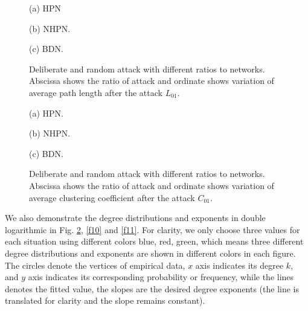 \documentclass[final]{IEEEtran}
\begin{document}
\begin{figure}[t!]
\centering
\begin{minipage}{0.3\linewidth}
\centering
\parbox{15.5cm}{\footnotesize \hspace{2.5cm}(a) HPN}
\end{minipage}
\begin{minipage}{0.3\linewidth}
    \centering
 \parbox{15.5cm}{\footnotesize \hspace{2.3cm}(b) NHPN.}
\end{minipage}
\begin{minipage}{0.3\linewidth}
    \centering
 \parbox{15.5cm}{\footnotesize \hspace{2.5cm}(c) BDN.}
\end{minipage}
\hspace{3ex}
 \caption{\label{f8} Deliberate and random attack with different ratios to networks. Abscissa shows the ratio of attack and ordinate shows variation of average path length after the attack $L_{01}$.}
\end{figure}
\begin{figure}
\centering
\begin{minipage}{0.3\linewidth}
\centering
\parbox{15.5cm}{\footnotesize \hspace{2.5cm}(a) HPN.}
\end{minipage}
\begin{minipage}{0.3\linewidth}
    \centering
 \parbox{15.5cm}{\footnotesize \hspace{2.3cm}(b) NHPN.}
\end{minipage}
\begin{minipage}{0.3\linewidth}
    \centering
 \parbox{15.5cm}{\footnotesize \hspace{2.5cm}(c) BDN.}
\end{minipage}
\hspace{3ex}
 \caption{\label{f9} Deliberate and random attack with different ratios to networks. Abscissa shows the ratio of attack and ordinate shows variation of average clustering  coefficient after the attack $C_{01}$.}
\end{figure}
We also demonstrate the degree distributions and exponents in
double logarithmic in Fig. \ref{f9}, \ref{f10} and \ref{f11}. For
clarity, we only choose three values for each situation using
different colors blue, red, green, which means three different
degree distributions and exponents are shown in different colors
in each figure. The circles denote the vertices of empirical data,
$x$ axis indicates its degree $k$, and $y$ axis indicates its
corresponding probability or frequency, while the lines denotes
the fitted value, the slopes are the desired degree exponents (the
line is translated for clarity and the slope remains constant).
\end{document}
